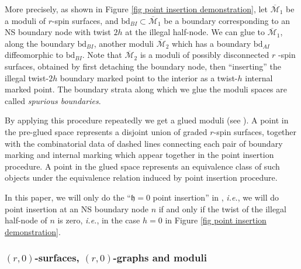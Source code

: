 \documentclass[11pt]{amsart}
\theoremstyle{definition}
\theoremstyle{remark}
\newcommand{\<}{\left<}
\renewcommand{\>}{\right>}
\numberwithin{equation}{section}
\def\Mbar{{\overline{\mathcal M}}}
\def\h{{\mathfrak h}}
\begin{document}
More %
precisely, as shown in Figure \ref{fig point insertion demonstration}, let $\Mbar_1$ be a moduli of $r$-spin surfaces, and $\text{bd}_{BI}\subset \Mbar_1$ be a boundary corresponding to an NS boundary node with twist $2h$ at the illegal half-node. We can glue to $\Mbar_1$, along the boundary $\text{bd}_{BI}$, another %
moduli $\Mbar_2$ which %
has a boundary $\text{bd}_{AI}$ diffeomorphic to $\text{bd}_{BI}$. Note that $\Mbar_2$ is a moduli of possibly disconnected $r$%
-spin surfaces, obtained %
by first detaching the %
boundary node, then %
``inserting'' the illegal twist-$2h$ boundary marked point to the interior as a twist-$h$ internal marked point. The boundary strata along which we glue the moduli spaces are called \emph{spurious boundaries}.

By applying this %
procedure repeatedly we %
get a glued moduli (see \cite[\S 4.6]{TZ1}). A point in the pre-glued space represents a disjoint union of graded $r$-spin surfaces, together with the combinatorial data of dashed lines connecting each pair of boundary marking and internal marking which appear together in the point insertion procedure. A point in the glued space represents an equivalence class of such objects under the equivalence relation induced by point insertion procedure.

In this paper, we will only do the ``$\h=0$ point insertion'' in \cite{TZ1}, \textit{i.e.}, we will  do point insertion at an NS boundary node $n$ if and only if the twist of the illegal half-node of $n$ is zero, \textit{i.e.}, in the case $h=0$ in %
Figure \ref{fig point insertion demonstration}.



\subsubsection{$(r,0)$-surfaces, $(r,0)$-graphs and moduli}
\end{document}

